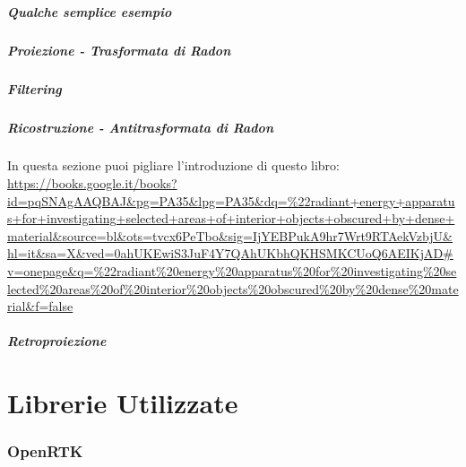 \documentclass[a4paper,11pt, oneside]{article}
\begin{document}
                \subsubsection{Qualche semplice esempio}

                \subsubsection{Proiezione - Trasformata di Radon}
                \subsubsection{Filtering}
                \subsubsection{Ricostruzione - Antitrasformata di Radon}
                    In questa sezione puoi pigliare l'introduzione di questo libro:
                    \url{https://books.google.it/books?id=pqSNAgAAQBAJ&pg=PA35&lpg=PA35&dq=%22radiant+energy+apparatus+for+investigating+selected+areas+of+interior+objects+obscured+by+dense+material&source=bl&ots=tvcx6PeTbo&sig=IjYEBPukA9hr7Wrt9RTAekVzbjU&hl=it&sa=X&ved=0ahUKEwiS3JuF4Y7QAhUKbhQKHSMKCUoQ6AEIKjAD#v=onepage&q=%22radiant%20energy%20apparatus%20for%20investigating%20selected%20areas%20of%20interior%20objects%20obscured%20by%20dense%20material&f=false}
                \subsubsection{Retroproiezione}
            
               
                        
    \part{Librerie Utilizzate}
        \section{OpenRTK}
\end{document}
